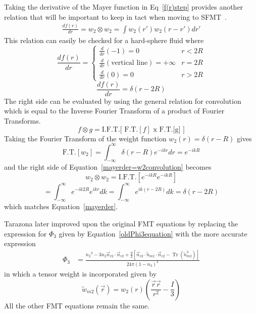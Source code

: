 \documentclass[double,12pt]{beavtex}
\begin{document}
Taking the derivative of the Mayer function in Eq~\ref{f(r)step} provides 
another relation that will be important to keep in tact when moving to 
SFMT~\cite{schmidt2000fluid}.
\begin{align}\label{mayerder=w2convolution}
     \frac{df(r)}{dr} = w_2 \otimes w_2 = \int{w_2(r')w_2(r-r')dr'}
\end{align} 
This relation can easily be checked for a hard-sphere fluid where
\begin{equation}{\frac{df(r)}{dr}=\left\{ \begin{array}{rc} \frac{d}{dr}(-1)=0 & r<2R \\\frac{d}{dr}(\text{vertical line})=+\infty & r=2R \\ \frac{d}{dr}(0)=0  & r>2R \end{array}\right.}\end{equation}
\begin{equation}\label{mayerder}{\frac{df(r)}{dr} = \delta(r-2R)}\end{equation} 
The right side can be evaluated by using the general relation for 
convolution which is equal to the Inverse Fourier Transform 
of a product of Fourier Transforms. 
\begin{equation}{f \otimes g = \text{I.F.T.[ F.T.}[f]\text{ x F.T.[g] }]}\end{equation} 
Taking the Fourier Transform of the weight function $w_2(r)=\delta(r-R)$ 
gives
\begin{equation}{\text{F.T.}[w_2]=\int_{-\infty}^{\infty}\delta(r-R)e^{-ikr}dr=e^{-ikR}}\end{equation} 
and the right side of Equation~\ref{mayerder=w2convolution} becomes
\begin{equation}{w_2 \otimes w_2 = \text{I.F.T.}[e^{-ikR}e^{-ikR}]}\end{equation} 
\begin{equation}\label{w2convolution}{=\int_{-\infty}^{\infty}e^{-ik2R}e^{ikr}dk=\int_{-\infty}^{\infty}e^{ik(r-2R)}dk=\delta(r-2R)}\end{equation} 
which matches Equation~\ref{mayerder}.

Tarazona later improved upon the original FMT equations by replacing the
expression for $\Phi_3$ given by Equation~\ref{oldPhi3equation} with the
more accurate expression~\cite{tarazonaphi3, santos2012phi3} 
\begin{align}
\Phi_3 &= \frac{{n_2}^3-3n_2\vec{n}_{v2}\cdot\vec{n}_{v2}+\frac{9}{2}[\vec{n}_{v2}\cdot{\overleftrightarrow{n}_{m2}}\cdot{\vec{n}_{v2}}-\operatorname{Tr}({\overleftrightarrow{n}^3_{m2}})]}{24\pi(1-n_3)^2}  \label{eq:Phi3}
\end{align}
in which a tensor weight is incorporated given by
\begin{equation}\label{eq:tensorweight}{\overleftrightarrow{w}_{m2}(\vec{r})=w_2(r)\left(\frac{\vec{r}\vec{r}}{r^2}-\frac{I}{3}\right)}\end{equation} 
All the other FMT equations remain the same. 
\end{document}
